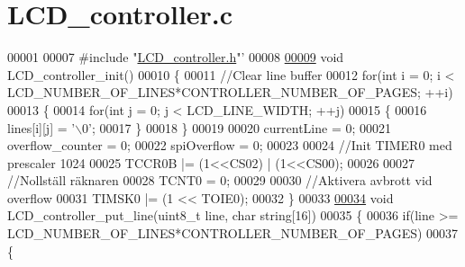 \hypertarget{_l_c_d__controller_8c_source}{}\section{L\+C\+D\+\_\+controller.\+c}
\label{_l_c_d__controller_8c_source}

\begin{DoxyCode}
00001 
00007 \textcolor{preprocessor}{#include "\hyperlink{_l_c_d__controller_8h}{LCD\_controller.h}"}\textcolor{stringliteral}{'}
00008 \textcolor{stringliteral}{}
\hypertarget{_l_c_d__controller_8c_source.tex_l00009}{}\hyperlink{_l_c_d__controller_8h_acdf924af672d862f021f6b4ace2bcebd}{00009} \textcolor{stringliteral}{void LCD\_controller\_init()}
00010 \textcolor{stringliteral}{\{}
00011 \textcolor{stringliteral}{    //Clear line buffer}
00012 \textcolor{stringliteral}{    for(int i = 0; i < LCD\_NUMBER\_OF\_LINES*CONTROLLER\_NUMBER\_OF\_PAGES; ++i)}
00013 \textcolor{stringliteral}{    \{}
00014 \textcolor{stringliteral}{        for(int j = 0; j < LCD\_LINE\_WIDTH; ++j)}
00015 \textcolor{stringliteral}{        \{}
00016 \textcolor{stringliteral}{            lines[i][j] = '}\(\backslash\)0\textcolor{stringliteral}{';}
00017 \textcolor{stringliteral}{        \}}
00018 \textcolor{stringliteral}{    \}}
00019 \textcolor{stringliteral}{    }
00020 \textcolor{stringliteral}{    currentLine = 0;}
00021 \textcolor{stringliteral}{    overflow\_counter = 0;}
00022 \textcolor{stringliteral}{    spiOverflow = 0;}
00023 \textcolor{stringliteral}{    }
00024 \textcolor{stringliteral}{    //Init TIMER0 med prescaler 1024}
00025 \textcolor{stringliteral}{    TCCR0B |= (1<<CS02) | (1<<CS00);}
00026 \textcolor{stringliteral}{    }
00027 \textcolor{stringliteral}{    //Nollställ räknaren}
00028 \textcolor{stringliteral}{    TCNT0 = 0;}
00029 \textcolor{stringliteral}{    }
00030 \textcolor{stringliteral}{    //Aktivera avbrott vid overflow}
00031 \textcolor{stringliteral}{    TIMSK0 |= (1 << TOIE0);}
00032 \textcolor{stringliteral}{\}}
00033 \textcolor{stringliteral}{}
\hypertarget{_l_c_d__controller_8c_source.tex_l00034}{}\hyperlink{_l_c_d__controller_8c_ac9b4126229db48d14f07d3ea3178b48a}{00034} \textcolor{stringliteral}{void LCD\_controller\_put\_line(uint8\_t line, char string[16])}
00035 \textcolor{stringliteral}{\{}
00036 \textcolor{stringliteral}{    if(line >= LCD\_NUMBER\_OF\_LINES*CONTROLLER\_NUMBER\_OF\_PAGES)}
00037 \textcolor{stringliteral}{    \{}

\end{DoxyCode}
